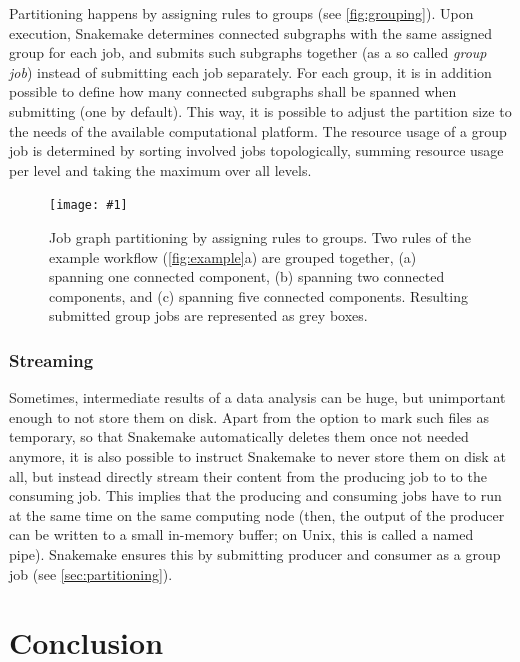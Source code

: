 \documentclass[parskip=half]{scrartcl}
\newcommand{\image}[1]{\centering\texttt{[image: \#1]}}
\begin{document}
Partitioning happens by assigning rules to groups (see \autoref{fig:grouping}).
Upon execution, Snakemake determines connected subgraphs with the same assigned group for each job, and submits such subgraphs together (as a so called \emph{group job}) instead of submitting each job separately.
For each group, it is in addition possible to define how many connected subgraphs shall be spanned when submitting (one by default).
This way, it is possible to adjust the partition size to the needs of the available computational platform.
The resource usage of a group job is determined by sorting involved jobs topologically, summing resource usage per level and taking the maximum over all levels.

\begin{figure}
	\image{group-jobs.pdf}
	\caption{Job graph partitioning by assigning rules to groups.
		Two rules of the example workflow (\autoref{fig:example}a) are grouped together, (a) spanning one connected component, (b) spanning two connected components, and (c) spanning five connected components.
		Resulting submitted group jobs are represented as grey boxes.
	}\label{fig:grouping}
\end{figure}

\subsubsection{Streaming}\label{sec:streaming}

Sometimes, intermediate results of a data analysis can be huge, but unimportant enough to not store them on disk.
Apart from the option to mark such files as temporary, so that Snakemake automatically deletes them once not needed anymore, it is also possible to instruct Snakemake to never store them on disk at all, but instead directly stream their content from the producing job to to the consuming job.
This implies that the producing and consuming jobs have to run at the same time on the same computing node (then, the output of the producer can be written to a small in-memory buffer; on Unix, this is called a named pipe).
Snakemake ensures this by submitting producer and consumer as a group job (see \autoref{sec:partitioning}).

\section{Conclusion}
\end{document}
